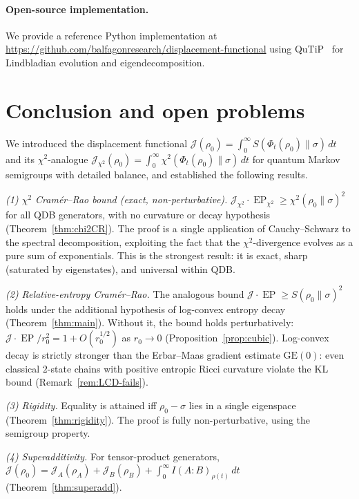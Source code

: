 \documentclass[11pt,a4paper]{article}
\theoremstyle{definition}
\theoremstyle{remark}
\DeclareMathOperator{\EP}{EP}
\newcommand{\GE}{\mathrm{GE}}
\newcommand{\Jchi}{\mathcal{J}_{\chi^2}}
\newcommand{\EPchi}{\EP_{\chi^2}}
\begin{document}
\paragraph{Open-source implementation.}
We provide a reference Python implementation at 
\url{https://github.com/balfagonresearch/displacement-functional} using 
QuTiP~\cite{Johansson2013} for Lindbladian evolution and eigendecomposition.

\section{Conclusion and open problems}\label{sec:conclusion}

We introduced the displacement functional
$\mathcal{J}(\rho_0) = \int_0^\infty S(\Phi_t(\rho_0)\|\sigma)\,dt$
and its $\chi^2$-analogue
$\Jchi(\rho_0) = \int_0^\infty\chi^2(\Phi_t(\rho_0)\|\sigma)\,dt$
for quantum Markov semigroups with detailed balance, and
established the following results.

\emph{(1) $\chi^2$ Cram\'er--Rao bound (exact,
non-perturbative).}
$\Jchi\cdot\EPchi \ge \chi^2(\rho_0\|\sigma)^2$ for all QDB
generators, with no curvature or decay hypothesis
(Theorem~\ref{thm:chi2CR}).  The proof is a single application
of Cauchy--Schwarz to the spectral decomposition, exploiting the
fact that the $\chi^2$-divergence evolves as a pure sum of
exponentials.  This is the strongest result: it is exact, sharp
(saturated by eigenstates), and universal within QDB\@.

\emph{(2) Relative-entropy Cram\'er--Rao.}
The analogous bound $\mathcal{J}\cdot\EP \ge S(\rho_0\|\sigma)^2$
holds under the additional hypothesis of log-convex entropy decay
(Theorem~\ref{thm:main}).  Without it, the bound holds
perturbatively: $\mathcal{J}\cdot\EP/r_0^2 = 1 +
O(r_0^{1/2})$ as $r_0 \to 0$
(Proposition~\ref{prop:cubic}).  Log-convex decay is strictly
stronger than the Erbar--Maas gradient estimate $\GE(0)$:
even classical $2$-state chains with positive entropic Ricci
curvature violate the KL bound
(Remark~\ref{rem:LCD-fails}).

\emph{(3) Rigidity.}  Equality is attained iff
$\rho_0 - \sigma$ lies in a single eigenspace
(Theorem~\ref{thm:rigidity}).  The proof is fully
non-perturbative, using the semigroup property.

\emph{(4) Superadditivity.}  For tensor-product generators,
$\mathcal{J}(\rho_0) = \mathcal{J}_A(\rho_A) +
\mathcal{J}_B(\rho_B) + \int_0^\infty I(A\!:\!B)_{\rho(t)}\,dt$
(Theorem~\ref{thm:superadd}).
\end{document}
